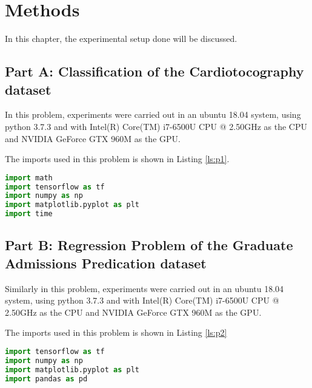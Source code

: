 \chapter{Methods}
\label{methods}

In this chapter, the experimental setup done will be discussed.

\section{Part A: Classification of the Cardiotocography dataset}
In this problem, experiments were carried out in an ubuntu 18.04 system, using python 3.7.3 and with Intel(R) Core(TM) i7-6500U CPU @ 2.50GHz as the CPU and NVIDIA GeForce GTX 960M as the GPU.

The imports used in this problem is shown in Listing \ref{ls:p1}.

\begin{lstlisting}[language=Python, caption= Imports used for problem 1, label=ls:p1]
import math
import tensorflow as tf
import numpy as np
import matplotlib.pyplot as plt
import time
\end{lstlisting}

\section{Part B: Regression Problem of the Graduate Admissions Predication dataset}
Similarly in this problem, experiments were carried out in an ubuntu 18.04 system, using python 3.7.3 and with Intel(R) Core(TM) i7-6500U CPU @ 2.50GHz as the CPU and NVIDIA GeForce GTX 960M as the GPU.

The imports used in this problem is shown in Listing \ref{ls:p2}

\begin{lstlisting}[language=Python, caption= Imports used for problem 2, label=ls:p2]
import tensorflow as tf
import numpy as np
import matplotlib.pyplot as plt
import pandas as pd
\end{lstlisting}
